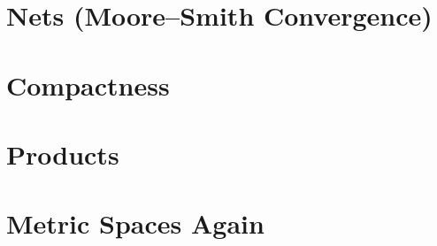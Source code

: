 \section{Nets (Moore--Smith Convergence)}





\section{Compactness}




\section{Products}
\addtocounter{subsection}{1}

\addtocounter{subsection}{-2}

\addtocounter{subsection}{1}








\section{Metric Spaces Again}


